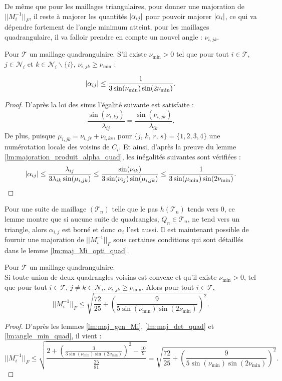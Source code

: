 \documentclass[12pt,a4paper]{article}
\begin{document}
	De même que pour les maillages triangulaires, pour donner une majoration de $|\!|M_i^{-1}|\!|_F$, il reste à majorer les quantités $\left\lvert \alpha_{ij} \right\rvert$ pour pouvoir majorer $\left\lvert \alpha_i \right\rvert$, ce qui va dépendre fortement de l'angle minimum atteint, pour les maillages quadrangulaire, il va falloir prendre en compte un nouvel angle : $\nu_{i,jk}$.
	
	\begin{lm}\label{lm:angle_min_quad}
		Pour $\mathcal T$ un maillage quadrangulaire. S'il existe $\nu_{\min} > 0$ tel que pour tout $i \in \mathcal T$, $j \in \mathcal N_i$ et $k \in \mathcal N_i\backslash\{i\}$, $\nu_{i,jk} \geq \nu_{\min}$ :
		
		\[
		\left\lvert \alpha_{ij} \right\rvert \leq \dfrac1{3\sin(\nu_{\min})\sin(2\nu_{\min})}.
		\]
	\end{lm}
	\begin{proof}
		D'après la loi des sinus l'égalité suivante est satisfaite :
		\begin{equation}
			\frac{\sin(\nu_{i,kj})}{\lambda_{ij}} = \frac{\sin(\nu_{i,jk})}{\lambda_{ik}}.
		\end{equation}
		De plus, puisque $\mu_{i,jk} = \nu_{i,jr}+\nu_{i,ks}$, pour $\{j,\,k,\,r,\,s\}=\{1,2,3,4\}$ une numérotation locale des voisins de $C_i$. Et ainsi, d'après la preuve du lemme \ref{lm:majoration_produit_alpha_quad}, les inégalités suivantes sont vérifiées : 
		\[
			\left\lvert \alpha_{ij} \right\rvert \leq \frac{\lambda_{ij}}{3\lambda_{ik}\sin(\mu_{i,jk})} \leq \frac{\sin(\nu_{ik})}{3\sin(\nu_{ij})\sin(\mu_{i,jk})} \leq \frac1{3\sin(\mu_{\min})\sin(2\nu_{\min})}.
		\]
	\end{proof}
	
	Pour une suite de maillage $(\mathcal T_n)$ telle que le pas $h(\mathcal T_n)$ tends vers 0, ce lemme montre que si aucune suite de quadrangles, $Q_n \in \mathcal T_n$, ne tend vers un triangle, alors $\alpha_{i,j}$ est borné et donc $\alpha_i$ l'est aussi. Il est maintenant possible de fournir une majoration de $|\!|M_i^{-1}|\!|_F$ sous certaines conditions qui sont détaillés dans le lemme \ref{lm:maj_Mi_opti_quad}.
	
	\newpage
	
	\begin{lm}\label{lm:maj_Mi_opti_quad}
		Pour $\mathcal T$ un maillage quadrangulaire.\\
		Si toute union de deux quadrangles voisins est convexe et qu'il existe $\nu_{\min} > 0$, tel que pour tout $i \in \mathcal T$, $j \not = k \in \mathcal N_i$, $\nu_{i,jk} \geq \nu_{\min}$. Alors pour tout $i \in \mathcal T$,
		\begin{equation}
			|\!|M_i^{-1}|\!|_F \leq \sqrt{\frac{72}{25}+\left(\frac{9}{5\sin(\nu_{\min})\sin(2\nu_{\min})}\right)^2}.
		\end{equation}
	\end{lm}
	\begin{proof}
		D'après les lemmes \ref{lm:maj_gen_Mi}, \ref{lm:maj_det_quad} et \ref{lm:angle_min_quad}, il vient :
		\[
		|\!|M_i^{-1}|\!|_F \leq \sqrt{\dfrac{2+\left(\frac{3}{3\sin(\nu_{\min})\sin(2\nu_{\min})}\right)^2 - \frac{10}9}{\frac{25}{81}}} = \sqrt{\frac{72}{25}+\left(\frac{9}{5\sin(\nu_{\min})\sin(2\nu_{\min})}\right)^2}.
		\]
	\end{proof}
	
\end{document}
